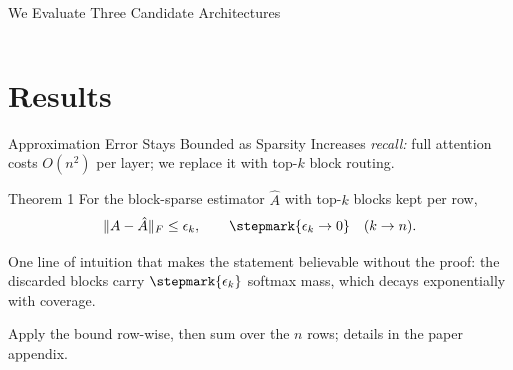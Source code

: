 \documentclass[aspectratio=169,11pt]{beamer}
\begin{document}
\begin{frame}{We Evaluate Three Candidate Architectures}
  \vspace{6pt}
  \begin{columns}[t]
      \vspace{6pt}
      \vspace{6pt}
  \end{columns}
\end{frame}

\section{Results}

\begin{frame}{Approximation Error Stays Bounded as Sparsity Increases}
  {\textit{recall:} full attention costs $O(n^2)$ per layer; we replace it
   with top-$k$ block routing.}
  \begin{block}{Theorem 1}
    For the block-sparse estimator $\hat{A}$ with top-$k$ blocks kept per row,
    \[
      \lVert A - \hat{A} \rVert_F \le \epsilon_k,
      \qquad \stepmark{\epsilon_k \to 0} \quad (k \to n).
    \]
  \end{block}
  One line of intuition that makes the statement believable without the proof:
  the discarded blocks carry $\stepmark{\epsilon_k}$ softmax mass, which decays
  exponentially with coverage.
  \begin{aacallout}
    Apply the bound row-wise, then sum over the $n$ rows; details in the paper
    appendix.
  \end{aacallout}
\end{frame}
\end{document}
